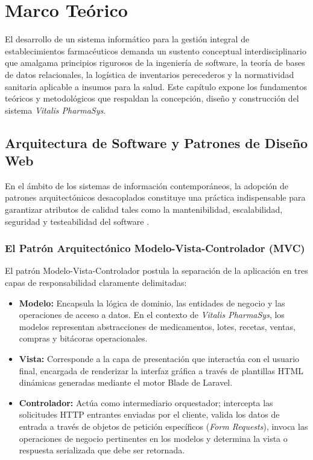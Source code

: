 \chapter{Marco Teórico}

El desarrollo de un sistema informático para la gestión integral de establecimientos farmacéuticos demanda un sustento conceptual interdisciplinario que amalgama principios rigurosos de la ingeniería de software, la teoría de bases de datos relacionales, la logística de inventarios perecederos y la normatividad sanitaria aplicable a insumos para la salud. Este capítulo expone los fundamentos teóricos y metodológicos que respaldan la concepción, diseño y construcción del sistema \textit{Vitalis PharmaSys}.

\section{Arquitectura de Software y Patrones de Diseño Web}

En el ámbito de los sistemas de información contemporáneos, la adopción de patrones arquitectónicos desacoplados constituye una práctica indispensable para garantizar atributos de calidad tales como la mantenibilidad, escalabilidad, seguridad y testeabilidad del software \cite{pressman2014, sommerville2011}.

\subsection{El Patrón Arquitectónico Modelo-Vista-Controlador (MVC)}
El patrón Modelo-Vista-Controlador postula la separación de la aplicación en tres capas de responsabilidad claramente delimitadas:
\begin{itemize}
    \item \textbf{Modelo:} Encapsula la lógica de dominio, las entidades de negocio y las operaciones de acceso a datos. En el contexto de \textit{Vitalis PharmaSys}, los modelos representan abstracciones de medicamentos, lotes, recetas, ventas, compras y bitácoras operacionales.
    \item \textbf{Vista:} Corresponde a la capa de presentación que interactúa con el usuario final, encargada de renderizar la interfaz gráfica a través de plantillas HTML dinámicas generadas mediante el motor Blade de Laravel.
    \item \textbf{Controlador:} Actúa como intermediario orquestador; intercepta las solicitudes HTTP entrantes enviadas por el cliente, valida los datos de entrada a través de objetos de petición específicos (\textit{Form Requests}), invoca las operaciones de negocio pertinentes en los modelos y determina la vista o respuesta serializada que debe ser retornada.
\end{itemize}

